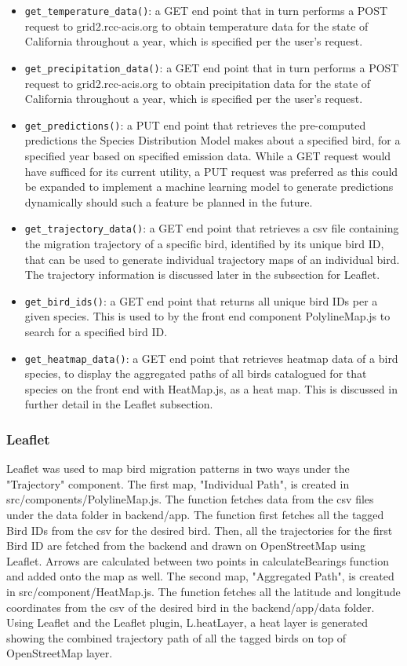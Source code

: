 \documentclass{article}
\begin{document}
\begin{itemize}
	\item \texttt{get\_temperature\_data()}: a GET end point that in turn performs a POST request to grid2.rcc-acis.org to obtain temperature data for the state of California throughout a year, which is specified per the user's request.
	\item \texttt{get\_precipitation\_data()}: a GET end point that in turn performs a POST request to grid2.rcc-acis.org to obtain precipitation data for the state of California throughout a year, which is specified per the user's request.
	\item \texttt{get\_predictions()}: a PUT end point that retrieves the pre-computed predictions the Species Distribution Model makes about a specified bird, for a specified year based on specified emission data. While a GET request would have sufficed for its current utility, a PUT request was preferred as this could be expanded to implement a machine learning model to generate predictions dynamically should such a feature be planned in the future.
	\item \texttt{get\_trajectory\_data()}: a GET end point that retrieves a csv file containing the migration trajectory of a specific bird, identified by its unique bird ID, that can be used to generate individual trajectory maps of an individual bird. The trajectory information is discussed later in the subsection for Leaflet.
	\item \texttt{get\_bird\_ids()}: a GET end point that returns all unique bird IDs per a given species. This is used to by the front end component PolylineMap.js to search for a specified bird ID.
	\item \texttt{get\_heatmap\_data()}: a GET end point that retrieves heatmap data of a bird species, to display the aggregated paths of all birds catalogued for that species on the front end with HeatMap.js, as a heat map. This is discussed in further detail in the Leaflet subsection.
\end{itemize}

\subsubsection*{Leaflet}
Leaflet was used to map bird migration patterns in two ways under the "Trajectory" component. The first map, "Individual Path", is created in src/components/PolylineMap.js.
The function fetches data from the csv files under the data folder in backend/app. The function first fetches all the tagged Bird IDs from the csv for the desired bird. Then,
all the trajectories for the first Bird ID are fetched from the backend and drawn on OpenStreetMap using Leaflet.  Arrows are calculated between two points in calculateBearings 
function and added onto the map as well. 
The second map, "Aggregated Path", is created in src/component/HeatMap.js. The function fetches all the latitude and longitude coordinates from the csv of the desired bird in 
the backend/app/data folder. Using Leaflet and the Leaflet plugin, L.heatLayer, a heat layer is generated showing the combined trajectory path of all the tagged birds on top of 
OpenStreetMap layer.  
\end{document}
